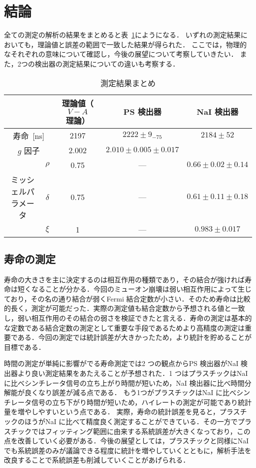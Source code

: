 \section{結論}
全ての測定の解析の結果をまとめると表~\ref{tab:result_conclusion}にようになる．
いずれの測定結果においても，理論値と誤差の範囲で一致した結果が得られた．
ここでは，物理的なそれぞれの意味について確認し，今後の展望について考察していきたい．
また，2つの検出器の測定結果についての違いも考察する．

\begin{table}[h]
\centering
\caption{測定結果まとめ}
\label{tab:result_conclusion}
\begin{tabular}{ccccc}\toprule
{} & {} & 理論値（$V-A$理論） & PS 検出器 & NaI 検出器\\ \midrule
\multicolumn{2}{c}{寿命~[ns]} &  2197 & $2222 \pm 9_{- 75}$ & $2184 \pm 52$\\
\multicolumn{2}{c}{$g$ 因子} & 2.002 & $2.010 \pm 0.005 \pm 0.017$ & {}\\ %
{} & $\rho$ & 0.75 & --- & $0.66 \pm 0.02 \pm 0.14$\\
ミッシェルパラメータ & $\delta$ & 0.75 & --- & $0.61 \pm 0.11 \pm 0.18$\\
{} & $\xi$ & 1 & --- & $0.983 \pm 0.017$\\ \bottomrule
\end{tabular}
\end{table}%

\subsection{寿命の測定}
寿命の大きさを主に決定するのは相互作用の種類であり，その結合が強ければ寿命は短くなることが分かる．今回のミューオン崩壊は弱い相互作用によって生じており，その名の通り結合が弱くFermi 結合定数が小さい．そのため寿命は比較的長く，測定が可能だった．実際の測定値も結合定数から予想される値と一致し，弱い相互作用のその結合の弱さを検証できたと言える．寿命の測定は基本的な定数である結合定数の測定として重要な手段であるためより高精度の測定は重要である．今回の測定では統計誤差が大きかったため，より統計を貯めることが目標である．

時間の測定が単純に影響がでる寿命測定では2 つの観点からPS 検出器がNaI 検出器より良い測定結果をあたえることが予想された．1 つはプラスチックはNaI に比べシンチレータ信号の立ち上がり時間が短いため，NaI 検出器に比べ時間分解能が良くなり誤差が減る点である．
もう1つがプラスチックはNaI に比べシンチレータ信号の立ち下がり時間が短いため，ハイレートの測定が可能であり統計量を増やしやすいという点である．
実際，寿命の統計誤差を見ると，プラスチックのほうがNaI に比べて精度良く測定することができている．その一方でプラスチックではフィッティング範囲に由来する系統誤差が大きくなっており，この点を改善していく必要がある．今後の展望としては，プラスチックと同様にNaI でも系統誤差のみが議論できる程度に統計を増やしていくとともに，解析手法を改良することで系統誤差も削減していくことがあげられる．

